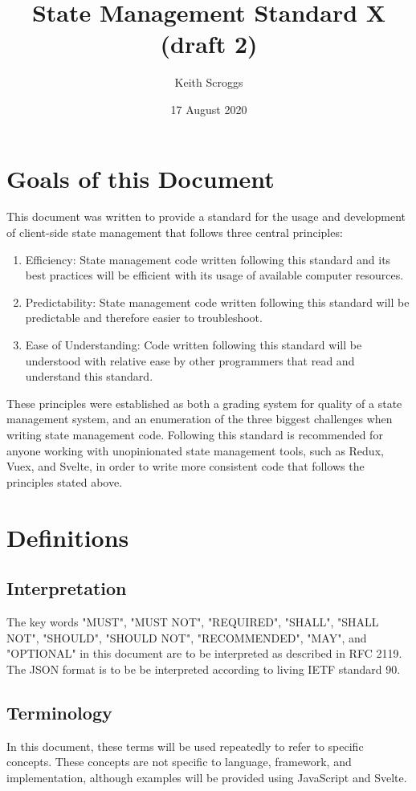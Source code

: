 \documentclass{article}
\title{State Management Standard X (draft 2)}
\author{Keith Scroggs}
\date{17 August 2020}
\begin{document}
\maketitle

\tableofcontents
\renewcommand{\lstlistlistingname}{Code Examples}
\lstlistoflistings
\newpage

\section{Goals of this Document}
This document was written to provide a standard for the usage and development of client-side state management that follows three central principles:
\begin{enumerate}
    \item Efficiency: State management code written following this standard and its best practices will be efficient with its usage of available computer resources.
    \item Predictability: State management code written following this standard will be predictable and therefore easier to troubleshoot.
    \item Ease of Understanding: Code written following this standard will be understood with relative ease by other programmers that read and understand this standard.
\end{enumerate}
These principles were established as both a grading system for quality of a state management system, and an enumeration of the three biggest challenges when writing state management code. Following this standard is recommended for anyone working with unopinionated state management tools, such as Redux, Vuex, and Svelte, in order to write more consistent code that follows the principles stated above.

\section{Definitions}

\subsection{Interpretation}
The key words "MUST", "MUST NOT", "REQUIRED", "SHALL", "SHALL NOT", "SHOULD", "SHOULD NOT", "RECOMMENDED", "MAY", and "OPTIONAL" in this document are to be interpreted as described in RFC 2119. The JSON format is to be be interpreted according to living IETF standard 90.

\subsection{Terminology}
In this document, these terms will be used repeatedly to refer to specific concepts. These concepts are not specific to language, framework, and implementation, although examples will be provided using JavaScript and Svelte.
\end{document}

